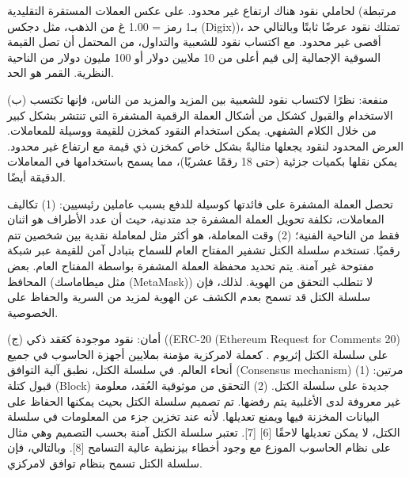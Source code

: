 لحاملي نقود هناك ارتفاع غير محدود. على عكس العملات المستقرة التقليدية (مرتبطة بـ1 رمز = 1.00 غ من الذهب، مثل دجكس (Digix))، تمتلك نقود عرضًا ثابتًا وبالتالي حد أقصى غير محدود. مع اكتساب نقود للشعبية والتداول، من المحتمل أن تصل القيمة السوقية الإجمالية إلى قيم أعلى من 10 ملايين دولار أو 100 مليون دولار من الناحية النظرية. القمر هو الحد.


(ب) منفعة:
نظرًا لاكتساب نقود للشعبية بين المزيد والمزيد من الناس، فإنها تكتسب الاستخدام والقبول كشكل من أشكال العملة الرقمية المشفرة التي تنتشر بشكل كبير من خلال الكلام الشفهي. يمكن استخدام النقود كمخزن للقيمة ووسيلة للمعاملات. العرض المحدود لنقود يجعلها مثاليةً بشكل خاص كمخزن ذي قيمة مع ارتفاع غير محدود. يمكن نقلها بكميات جزئية (حتى 18 رقمًا عشريًا)، مما يسمح باستخدامها في المعاملات الدقيقة أيضًا.


تحصل العملة المشفرة على فائدتها كوسيلة للدفع بسبب عاملين رئيسيين: (1) تكاليف المعاملات، تكلفة تحويل العملة المشفرة جد متدنية، حيث أن عدد الأطراف هو اثنان فقط من الناحية الفنية؛ (2) وقت المعاملة، هو أكثر مثل لمعاملة نقدية بين شخصين تتم رقميًا. تستخدم سلسلة الكتل تشفير المفتاح العام للسماح بتبادل آمن للقيمة عبر شبكة مفتوحة غير آمنة. يتم تحديد محفظة العملة المشفرة بواسطة المفتاح العام. بعض المحافظ (مثل ميطاماسك (MetaMask)) لا تتطلب التحقق من الهوية. لذلك، فإن سلسلة الكتل قد تسمح بعدم الكشف عن الهوية لمزيد من السرية والحفاظ على الخصوصية.


(ج) أمان:
نقود موجودة كعَقد ذكي ((ERC-20 (Ethereum Request for Comments 20) على سلسلة الكتل إثريوم . كعملة لامركزية مؤمنة بملايين أجهزة الحاسوب في جميع أنحاء العالم. في سلسلة الكتل، نطبق آلية التوافق (Consensus mechanism) مرتين: (1) قبول كتلة (Block) جديدة على سلسلة الكتل. (2) التحقق من موثوقية العُقد، معلومة غير معروفة لدى الأغلبية يتم رفضها. تم تصميم سلسلة الكتل بحيث يمكنها الحفاظ على البيانات المخزنة فيها ويمنع تعديلها.  لأنه عند تخزين جزء من المعلومات في سلسلة الكتل، لا يمكن تعديلها لاحقًا [6] [7]. تعتبر سلسلة الكتل آمنة بحسب التصميم وهي مثال على نظام الحاسوب الموزع مع وجود أخطاء بيزنطية عالية التسامح [8]. وبالتالي، فإن سلسلة الكتل تسمح بنظام توافق لامركزي.


